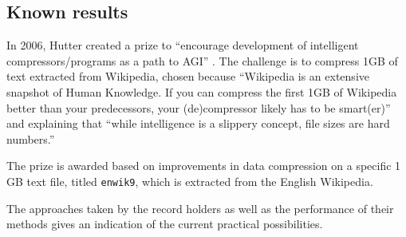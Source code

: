 \subsection{Known results}

In 2006, Hutter created a prize to “encourage development of intelligent compressors/programs as a path to AGI” \autocite{Hutter2006}. The challenge is to compress 1GB of text extracted from Wikipedia, chosen because “Wikipedia is an extensive snapshot of Human Knowledge. If you can compress the first 1GB of Wikipedia better than your predecessors, your (de)compressor likely has to be smart(er)” and explaining that “while intelligence is a slippery concept, file sizes are hard numbers.”

The prize is awarded based on improvements in data compression on a specific 1 GB text file, titled \texttt{enwik9}, which is extracted from the English Wikipedia.

The approaches taken by the record holders as well as the performance of their methods gives an indication of the current practical possibilities.

